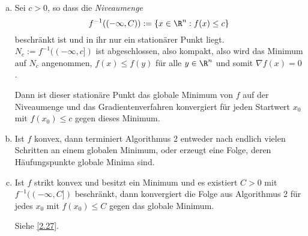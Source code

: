 \begin{kor} \label{2.26}
	\begin{enumerate}[(a)]
		\item
			Sei $c > 0$, so dass die \emph{Niveaumenge}
			\[
				f^{-1}((-\infty, C))
				:= \{ x \in \R^n : f(x) \le c \}
			\]
			beschränkt ist und in ihr nur ein stationärer Punkt liegt.
			$N_c := f^{-1}((-\infty,c])$ ist abgeschlossen, also kompakt, also wird das Minimum auf $N_c$ angenommen, $f(x) \le f(y)$ für alle $y \in \R^n$ und somit $\nabla f(x) = 0$.

			Dann ist dieser stationäre Punkt das globale Minimum von $f$ auf der Niveaumenge und das Gradientenverfahren konvergiert für jeden Startwert $x_0$ mit $f(x_0) \le c$ gegen dieses Minimum.
		\item
			Ist $f$ konvex, dann terminiert Algorithmus 2 %
			entweder nach endlich vielen Schritten an einem globalen Minimum, oder erzeugt eine Folge, deren Häufungspunkte globale Minima sind.
		\item
			Ist $f$ strikt konvex und besitzt ein Minimum und es existiert $C > 0$ mit $f^{-1}((-\infty,C])$ beschränkt, dann konvergiert die Folge aus Algorithmus 2 %
			für jedes $x_0$ mit $f(x_0) \le C$ gegen das globale Minimum.

			Siehe \ref{2.27}.
	\end{enumerate}
\end{kor}


